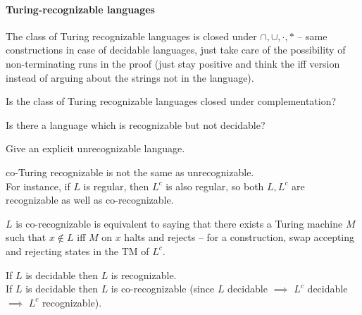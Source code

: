 \documentclass[a4paper]{article}
\newcommand{\nl}{\vspace{0.2cm}\\}
\begin{document}
\paragraph{Turing-recognizable languages} The class of Turing recognizable languages is closed under $\cap, \cup, \cdot, *$ -- same constructions in case of decidable languages, just take care
of the possibility of non-terminating runs in the proof (just stay positive and think the iff version instead of arguing about the strings not in the language).

\begin{ques}
    Is the class of Turing recognizable languages closed under complementation?
\end{ques}

\begin{ques}
    Is there a language which is recognizable but not decidable?
\end{ques}

\begin{ques}
    Give an explicit unrecognizable language.
\end{ques}

\begin{note}
    co-Turing recognizable is not the same as unrecognizable.\nl
    For instance, if $L$ is regular, then $L^c$ is also regular, so both $L, L^c$ are recognizable as well as co-recognizable.
\end{note}
 \begin{note}
     $L$ is co-recognizable is equivalent to saying that there exists a Turing machine $M$ such that $x \not\in L$ iff $M$ on $x$ halts and rejects -- for a construction, swap accepting and
     rejecting states in the TM of $L^c$.
 \end{note}

 \begin{obs}
     If $L$ is decidable then $L$ is recognizable.\nl
     If $L$ is decidable then $L$ is co-recognizable (since $L$ decidable $\implies$ $L^c$ decidable $\implies$ $L^c$ recognizable).\nl
\end{obs}
\end{document}
